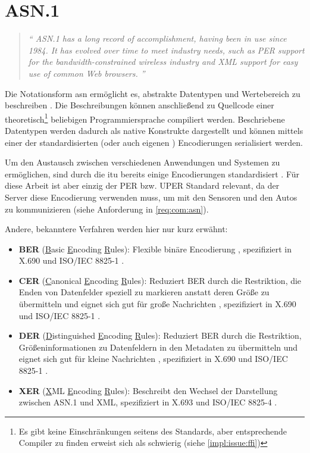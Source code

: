 
\section{ASN.1}

\begin{quotation}
	\textit{\enquote{
			ASN.1 has a long record of accomplishment, having been in use since 1984. It has evolved over time to meet industry needs, such as PER support for the bandwidth-constrained wireless industry and XML support for easy use of common Web browsers.
		}}
	\cite{asn:itu:asn.1}
\end{quotation}

Die Notationsform \gls{asn} ermöglicht es, abstrakte Datentypen und Wertebereich zu beschreiben \cite{asn:layman}.
Die Beschreibungen können anschließend zu Quellcode einer theoretisch\footnote{Es gibt keine Einschränkungen seitens des Standards, aber entsprechende Compiler zu finden erweist sich als schwierig (siehe \autoref{impl:issue:ffi})} beliebigen Programmiersprache compiliert werden.
Beschriebene Datentypen werden dadurch als native Konstrukte dargestellt und können mittels einer der standardisierten (oder auch eigenen \cite{asn:itu:ecn}) Encodierungen serialisiert werden.

Um den Austausch zwischen verschiedenen Anwendungen und Systemen zu ermöglichen, sind durch die \gls{itu}  bereits einige Encodierungen standardisiert \cite[8]{asn:itu:x691}.
Für diese Arbeit ist aber einzig der PER bzw. UPER Standard relevant, da der Server diese Encodierung verwenden muss, um mit den Sensoren und den Autos zu kommunizieren (siehe Anforderung in \autoref{req:com:asn}).

Andere, bekanntere Verfahren werden hier nur kurz erwähnt:
\begin{itemize}
	\item \textbf{BER} (\underline{B}asic \underline{E}ncoding \underline{R}ules): Flexible binäre Encodierung \cite{asn:wiki:x690}, spezifiziert in X.690 \cite{asn:itu:x690} und ISO/IEC 8825-1 \cite{asn:iso}.
	\item \textbf{CER} (\underline{C}anonical \underline{E}ncoding \underline{R}ules): Reduziert BER durch die Restriktion, die Enden von Datenfelder speziell zu markieren anstatt deren Größe zu übermitteln und eignet sich gut für große Nachrichten \cite{asn:wiki:x690}, spezifiziert in X.690 \cite{asn:itu:x690} und ISO/IEC 8825-1 \cite{asn:iso}.
	\item \textbf{DER} (\underline{D}istinguished \underline{E}ncoding \underline{R}ules): Reduziert BER durch die Restriktion, Größeninformationen zu Datenfeldern in den Metadaten zu übermitteln und eignet sich gut für kleine Nachrichten \cite{asn:wiki:x690}, spezifiziert in X.690 \cite{asn:itu:x690} und ISO/IEC 8825-1 \cite{asn:iso}.
	\item \textbf{XER} (\underline{X}ML \underline{E}ncoding \underline{R}ules): Beschreibt den Wechsel der Darstellung zwischen ASN.1 und XML, spezifiziert in X.693 \cite{asn:itu:x693} und ISO/IEC 8825-4 \cite{asn:iso}.
\end{itemize}


